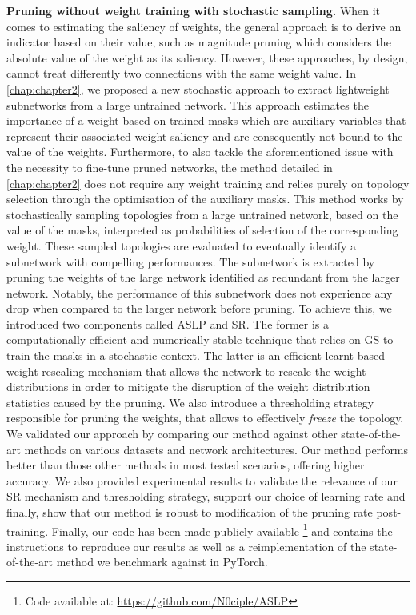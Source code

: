 \noindent \textbf{Pruning without weight training with stochastic sampling.}
When it comes to estimating the saliency of weights, the general approach is to
derive an indicator based on their value, such as magnitude pruning which
considers the absolute value of the weight as its saliency. However, these
approaches, by design, cannot treat differently two connections with the same
weight value. In \cref{chap:chapter2}, we proposed a new stochastic approach to
extract lightweight subnetworks from a large untrained network. This approach
estimates the importance of a weight based on trained masks which are auxiliary
variables that represent their associated weight saliency and are consequently
not bound to the value of the weights. Furthermore, to also tackle the
aforementioned issue with the necessity to fine-tune pruned networks, the method
detailed in \cref{chap:chapter2} does not require any weight training and relies
purely on topology selection through the optimisation of the auxiliary masks.
This method works by stochastically sampling topologies from a large untrained
network, based on the value of the masks, interpreted as probabilities of
selection of the corresponding weight. These sampled topologies are evaluated to
eventually identify a subnetwork with compelling performances. The subnetwork is
extracted by pruning the weights of the large network identified as redundant
from the larger network. Notably, the performance of this subnetwork does not
experience any drop when compared to the larger network before pruning. To
achieve this, we introduced two components called \acf{ASLP} and \acf{SR}. The
former is a computationally efficient and numerically stable technique that
relies on \acl{GS} to train the masks in a stochastic context. The latter is an
efficient learnt-based weight rescaling mechanism that allows the network to
rescale the weight distributions in order to mitigate the disruption of the
weight distribution statistics caused by the pruning. We also introduce a
thresholding strategy responsible for pruning the weights, that allows to
effectively \emph{freeze} the topology.\\

We validated our approach by comparing our method against other state-of-the-art
methods on various datasets and network architectures. Our method performs
better than those other methods in most tested scenarios, offering higher
accuracy. We also provided experimental results to validate the relevance of our
\ac{SR} mechanism and thresholding strategy, support our choice of learning rate
and finally, show that our method is robust to modification of the pruning rate
post-training. Finally, our code has been made publicly available \footnote{Code
available at: \url{https://github.com/N0ciple/ASLP}} and contains the
instructions to reproduce our results as well as a reimplementation of the
state-of-the-art method we benchmark against in PyTorch.\\ 

